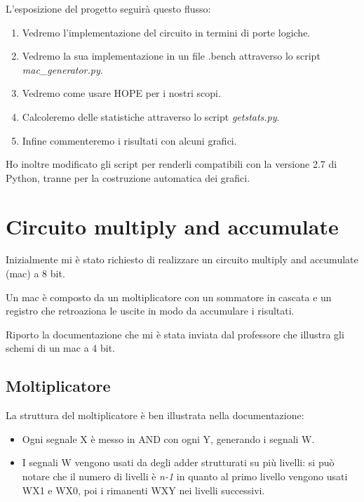 \documentclass[12pt, letterpaper]{article}
\begin{document}
L'esposizione del progetto seguirà questo flusso: 
\begin{enumerate}
\item Vedremo l'implementazione del circuito in termini di porte logiche.
\item Vedremo la sua implementazione in un file .bench attraverso lo script \textit{mac\_generator.py}.
\item Vedremo come usare HOPE per i nostri scopi.
\item Calcoleremo delle statistiche attraverso lo script \textit{getstats.py}.
\item Infine commenteremo i risultati con alcuni grafici.
\end{enumerate}

Ho inoltre modificato gli script per renderli compatibili con la versione 2.7 di Python, tranne per la costruzione automatica dei grafici.

\section{Circuito multiply and accumulate}

Inizialmente mi è stato richiesto di realizzare un circuito multiply and accumulate (mac) a 8 bit.

Un mac è composto da un moltiplicatore con un sommatore in cascata e un registro che retroaziona le uscite in modo da accumulare i risultati.

Riporto la documentazione che mi è stata inviata dal professore che illustra gli schemi di un mac a 4 bit.



\newpage
\subsection{Moltiplicatore}
La struttura del moltiplicatore è ben illustrata nella documentazione:

\begin{itemize}
  \item Ogni segnale X è messo in AND con ogni Y, generando i segnali W.
  \item I segnali W vengono usati da degli adder strutturati su più livelli: si può notare che il numero di livelli è \textit{n-1} in quanto al primo livello vengono usati WX1 e WX0, poi i rimanenti WXY nei livelli successivi.
\end{itemize}
\end{document}
